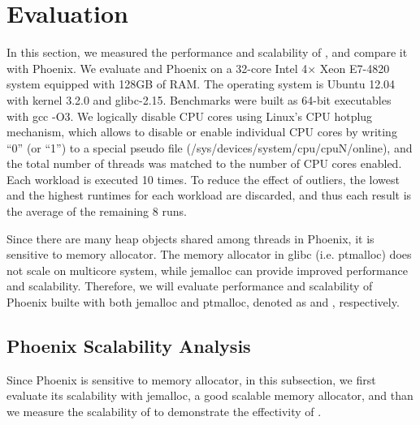 \section{Evaluation}
\label{sec:eval}
In this section, we measured the performance and scalability of \myds, and compare it with Phoenix.  
We evaluate \myds and Phoenix on a 32-core Intel 4× Xeon E7-4820 system equipped with 128GB of RAM. 
The operating system is Ubuntu 12.04 with kernel 3.2.0 and glibc-2.15.
Benchmarks were built as 64-bit executables with gcc -O3.
We logically disable CPU cores using Linux’s CPU hotplug mechanism, which allows to disable or enable individual CPU cores by writing “0” (or “1”) to a special pseudo file (/sys/devices/system/cpu/cpuN/online), and the total number of threads was matched to the number of CPU cores enabled.
Each workload is executed 10 times. 
To reduce the effect of outliers, the lowest and the highest runtimes for each workload are discarded, and thus each result is the average of the remaining 8 runs.


Since there are many heap objects shared among threads in Phoenix, it is sensitive to memory allocator\cite{yoo2009phoenix2}.
The memory allocator in glibc (i.e. ptmalloc\cite{gloger1997ptmalloc}) does not scale on multicore system, while jemalloc can provide improved performance and scalability\cite{evans2006jemalloc}. 
Therefore, we will evaluate performance and scalability of Phoenix builte with both jemalloc and ptmalloc, denoted as  and , respectively.

\subsection{Phoenix Scalability Analysis}
Since Phoenix is sensitive to memory allocator\cite{yoo2009phoenix2}, in this subsection, we first evaluate its scalability with jemalloc, a good scalable memory allocator, and than we measure the scalability of \myds to demonstrate the effectivity of \myds .

